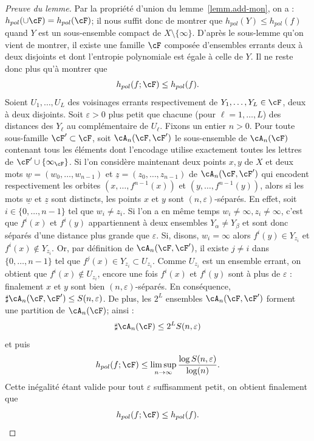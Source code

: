 \begin{proof}[Preuve du lemme]
Par la propriété d'union du lemme~\ref{lemm.add-mon}, on a : $h_{pol}(\cup \cF) = h_{pol}(\cF)$; il nous suffit donc de montrer que $h_{pol}(Y) \leq h_{pol}(f)$ quand $Y$ est un sous-ensemble compact de $X \setminus\{\infty\}$. D'après le sous-lemme qu'on vient de montrer, il existe une famille $\cF$ composée d'ensembles errants deux à deux disjoints et dont l'entropie polynomiale est égale à celle de $Y$. Il ne reste donc plus qu'à montrer que
\[
h_{pol}(f;\cF) \leq h_{pol}(f).
\]
Soient $U_1, \dots, U_L$ des voisinages errants respectivement de $Y_1, \dots, Y_L \in \cF$, deux à deux disjoints. Soit $\varepsilon>0$ plus petit que chacune (pour $\ell=1, \dots, L$) des distances des $Y_\ell$ au complémentaire de $U_\ell$. Fixons un entier $n > 0$. Pour toute sous-famille $\cF' \subset \cF$, soit $\cA_n(\cF,\cF')$ le sous-ensemble de $\cA_n(\cF)$ contenant tous les éléments dont l'encodage utilise exactement toutes les lettres de $\cF' \cup \{\infty_\cF\}$. Si l'on considère maintenant deux points $x,y$ de $X$ et deux mots $\underline{w} = (w_{0}, \dots, w_{n-1})$ et $\underline{z} = (z_{0}, \dots, z_{n-1})$ de $\cA_n(\cF,\cF')$ qui encodent respectivement les orbites $(x, \dots, f^{n-1}(x))$ et $(y, \dots, f^{n-1}(y))$, alors si les mots $\underline{w}$ et $\underline{z}$ sont distincts, les points $x$ et $y$ sont $(n,\varepsilon)$-séparés. En effet, soit $i \in \{0, \dots, n-1\}$ tel que $w_i \neq z_i$. Si l'on a en même temps $w_i \neq \infty, z_i \neq \infty$, c'est que $f^i(x)$ et $f^i(y)$ appartiennent à deux ensembles $Y_{\alpha} \neq Y_\beta$ et sont donc séparés d'une distance plus grande que $\varepsilon$. Si, disons, $w_i=\infty$ alors $f^i(y) \in Y_{z_i}$ et $f^i(x) \not \in Y_{z_i}$. Or, par définition de $\cA_n(\cF,\cF')$, il existe $j \neq i$ dans $\{0, \dots, n-1\}$ tel que $f^j(x) \in Y_{z_i} \subset U_{z_i}$. Comme $U_{z_i}$ est un ensemble errant, on obtient que $f^i(x) \not \in U_{z_i}$, encore une fois $f^i(x)$ et $f^i(y)$ sont à plus de $\varepsilon$ {: finalement} $x$ et $y$ sont bien $(n,\varepsilon)$-séparés. En conséquence, $\sharp \cA_n(\cF,\cF') \leq S(n, \varepsilon)$. De plus, les $2^L$ ensembles $\cA_n(\cF,\cF')$ forment une partition de $\cA_n(\cF)$; ainsi :
\[
\sharp \cA_n(\cF) \leq 2^L S(n, \varepsilon)
\]
et puis
\[
h_{pol}(f; \cF) \leq \limsup_{n \to \infty} \frac{\log S(n, \varepsilon)}{\log (n)}.
\]
Cette inégalité étant valide pour tout $\varepsilon$ suffisamment petit, on obtient finalement que
\[
h_{pol}(f; \cF) \leq h_{pol}(f).\qedhere
\]
\end{proof}

